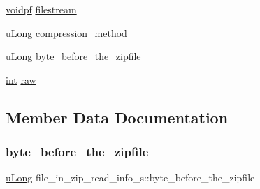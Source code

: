 \begin{DoxyCompactItemize}
\item 
\hyperlink{ioapi_8h_a39ab6d73c1cd44bc17064c2dcbb3e753}{voidpf} \hyperlink{structfile__in__zip__read__info__s_ab0b66746406599abe4528b7b48961bba}{filestream}
\item 
\hyperlink{ioapi_8h_a50e9e9d5c30e481de822ad68fe537986}{u\+Long} \hyperlink{structfile__in__zip__read__info__s_a86cbaa96568192cae9ab9cd606963fdb}{compression\+\_\+method}
\item 
\hyperlink{ioapi_8h_a50e9e9d5c30e481de822ad68fe537986}{u\+Long} \hyperlink{structfile__in__zip__read__info__s_a52c8e657a1238a3b9fa87b4167d9b7a3}{byte\+\_\+before\+\_\+the\+\_\+zipfile}
\item 
\hyperlink{ioapi_8h_a787fa3cf048117ba7123753c1e74fcd6}{int} \hyperlink{structfile__in__zip__read__info__s_aec0649000ce059ef1262b5a5be1641fe}{raw}
\end{DoxyCompactItemize}


\subsection{Member Data Documentation}
\mbox{\label{structfile__in__zip__read__info__s_a52c8e657a1238a3b9fa87b4167d9b7a3}} 
\subsubsection{\texorpdfstring{byte\+\_\+before\+\_\+the\+\_\+zipfile}{byte\_before\_the\_zipfile}}
{\footnotesize\ttfamily \hyperlink{ioapi_8h_a50e9e9d5c30e481de822ad68fe537986}{u\+Long} file\+\_\+in\+\_\+zip\+\_\+read\+\_\+info\+\_\+s\+::byte\+\_\+before\+\_\+the\+\_\+zipfile}

\mbox{\label{structfile__in__zip__read__info__s_a86cbaa96568192cae9ab9cd606963fdb}} 
